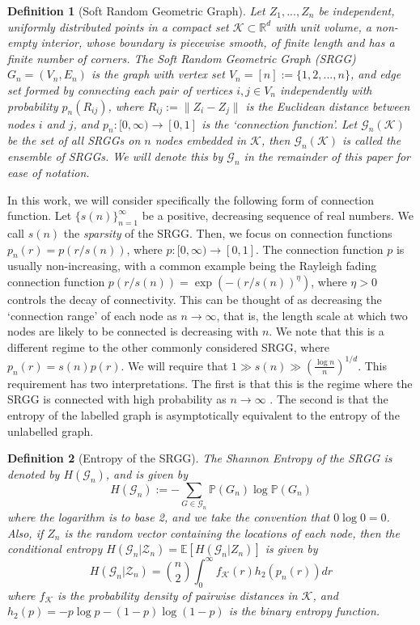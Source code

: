 \documentclass[conference,letterpaper]{IEEEtran}
\newtheorem{definition}{Definition}
\newcommand{\tti}{\rightarrow\infty}
\newcommand{\graph}{\mathcal{G}}
\newcommand{\prob}[1]{\mathbb{P}\left(#1\right)}
\begin{document}
\begin{definition}[Soft Random Geometric Graph]
    Let $Z_1,...,Z_n$ be independent, uniformly distributed points in a compact set $\mathcal{K} \subset \mathbb{R}^d$ with unit volume, a non-empty interior, whose boundary is piecewise smooth, of finite length and has a finite number of corners. The Soft Random Geometric Graph (SRGG) $G_n = (V_n, E_n)$ is the graph with vertex set $V_n = [n] := \{1,2,...,n\}$, and edge set formed by connecting each pair of vertices $i, j \in V_n$ independently with probability $p_n(R_{ij})$, where $R_{ij} := \|Z_i-Z_j\|$ is the Euclidean distance between nodes $i$ and $j$, and $p_n : [0,\infty) \to [0,1]$ is the `connection function'. Let $\graph_n(\mathcal{K})$ be the set of all SRGGs on $n$ nodes embedded in $\mathcal{K}$, then $\graph_n(\mathcal{K})$ is called the ensemble of SRGGs. We will denote this by $\graph_n$ in the remainder of this paper for ease of notation.
\end{definition}
In this work, we will consider specifically the following form of connection function. Let $\{s(n)\}_{n=1}^\infty$ be a positive, decreasing sequence of real numbers. We call $s(n)$ the \textit{sparsity} of the SRGG. Then, we focus on connection functions $p_n(r) = p(r/s(n))$, where $p : [0,\infty) \to [0,1]$. The connection function $p$ is usually non-increasing, with a common example being the Rayleigh fading connection function $p(r/s(n)) = \exp(-(r/s(n))^\eta)$, where $\eta > 0$ controls the decay of connectivity. This can be thought of as decreasing the `connection range' of each node as $n\tti$, that is, the length scale at which two nodes are likely to be connected is decreasing with $n$. We note that this is a different regime to the other commonly considered SRGG, where $p_n(r) = s(n)p(r)$. We will require that $1 \gg s(n) \gg \left(\frac{\log n}{n}\right)^{1/d}$. This requirement has two interpretations. The first is that this is the regime where the SRGG is connected with high probability as $n\tti$ \cite{penrose2016connectivity}. The second is that the entropy of the labelled graph is asymptotically equivalent to the entropy of the unlabelled graph.

\begin{definition}[Entropy of the SRGG]
    The Shannon Entropy of the SRGG is denoted by $H(\graph_n)$, and is given by
    \begin{equation}
        H(\graph_n) := - \sum_{G \in \graph_n} \prob{G_n}\log \prob{G_n}
    \end{equation}
    where the logarithm is to base 2, and we take the convention that $0 \log 0 = 0$. Also, if $Z_n$ is the random vector containing the locations of each node, then the conditional entropy $H(\graph_n|\mathcal{Z}_n) = \mathbb{E}[H(\graph_n | Z_n)]$ is given by
    \begin{equation}
        H(\graph_n|\mathcal{Z}_n) = \binom{n}{2}\int_0^\infty f_{\mathcal{K}}(r)h_2(p_n(r))dr
    \end{equation}
    where $f_{\mathcal{K}}$ is the probability density of pairwise distances in $\mathcal{K}$, and $h_2(p) = -p\log p-(1-p)\log(1-p)$ is the binary entropy function.
\end{definition}
\end{document}
